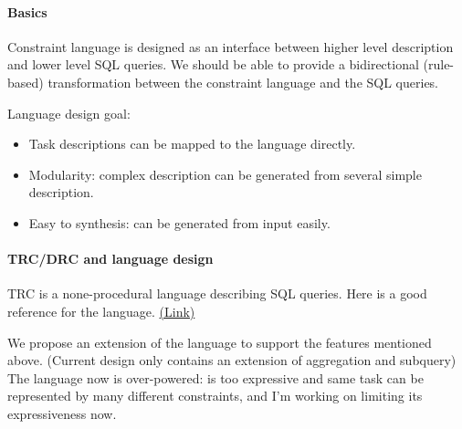 \documentclass[letter, notitlepage]{article}
\begin{document}
\paragraph{Basics} Constraint language is designed as an interface between higher level description and lower level SQL queries. We should be able to provide a bidirectional (rule-based) transformation between the constraint language and the SQL queries.

Language design goal:

\begin{itemize}\itemsep-1pt
\item Task descriptions can be mapped to the language directly.
\item Modularity: complex description can be generated from several simple description.
\item Easy to synthesis: can be generated from input easily.
\end{itemize}

\paragraph{TRC/DRC and language design} TRC is a none-procedural language describing SQL queries. Here is a good reference for the language. 
\href{http://www.cs.sfu.ca/CourseCentral/354/zaiane/material/notes/Chapter3/node11.html}{(Link)}

We propose an extension of the language to support the features mentioned above. (Current design only contains an extension of aggregation and subquery) The language now is over-powered: is too expressive and same task can be represented by many different constraints, and I'm working on limiting its expressiveness now.
\end{document}
